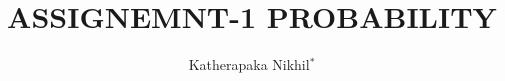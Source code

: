 \documentclass[journal,12pt,twocolumn]{IEEEtran}
\begin{document}
\let\vec\mathbf







\vspace{3cm}

\title{
ASSIGNEMNT-1 PROBABILITY
}
\author{ Katherapaka Nikhil$^{*}$%
}	


\maketitle

\newpage


\bigskip

\renewcommand{\thefigure}{\theenumi}
\renewcommand{\thetable}{\theenumi}


%
\end{document}
